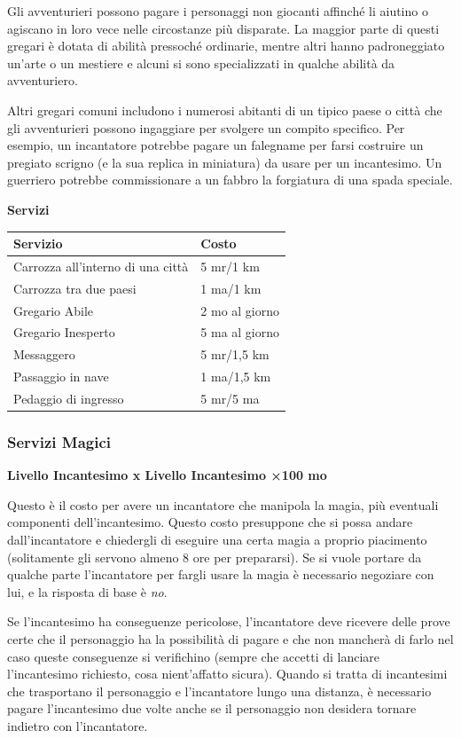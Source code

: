 \begin{multicols}{2}
\medskip

Gli avventurieri possono pagare i personaggi non giocanti affinché li aiutino o agiscano in loro vece nelle circostanze più disparate. La maggior parte di questi gregari è dotata di abilità pressoché ordinarie, mentre altri hanno padroneggiato un'arte o un mestiere e alcuni si sono specializzati in qualche abilità da avventuriero.

Altri gregari comuni includono i numerosi abitanti di un tipico paese o città che gli avventurieri possono ingaggiare per svolgere un compito specifico. Per esempio, un incantatore potrebbe pagare un falegname per farsi costruire un pregiato scrigno (e la sua replica in miniatura) da usare per un incantesimo.
Un guerriero potrebbe commissionare a un fabbro la forgiatura di una spada speciale.

\medskip

\textbf{Servizi}

\bigskip

\noindent\begin{tabularx}{\linewidth}{Xl}
	\toprule
\textbf{Servizio}&\textbf{Costo}\\
\toprule
Carrozza all'interno di una città&5 mr/1 km\\
Carrozza tra due paesi&1 ma/1 km\\
Gregario Abile&2 mo al giorno\\
Gregario Inesperto&5 ma al giorno\\
Messaggero&5 mr/1,5 km\\
Passaggio in nave&1 ma/1,5 km\\
Pedaggio di ingresso&5 mr/5 ma
\end{tabularx}

\subsubsection{Servizi Magici}

\textbf{Livello Incantesimo x Livello Incantesimo ×100 mo}

Questo è il costo per avere un incantatore che manipola la magia, più eventuali componenti dell'incantesimo. Questo costo presuppone che si possa andare dall'incantatore e chiedergli di eseguire una certa magia a proprio piacimento (solitamente gli servono almeno 8 ore per prepararsi). Se si vuole portare da qualche parte l'incantatore per fargli usare la magia è necessario negoziare con lui, e la risposta di base è \emph{no}.

Se l'incantesimo ha conseguenze pericolose, l'incantatore deve ricevere delle prove certe che il personaggio ha la possibilità di pagare e che non mancherà di farlo nel caso queste conseguenze si verifichino (sempre che accetti di lanciare l'incantesimo richiesto, cosa nient'affatto sicura). Quando si tratta di incantesimi che trasportano il personaggio e l'incantatore lungo una distanza, è necessario pagare l'incantesimo due volte anche se il personaggio non desidera tornare indietro con l'incantatore.


\end{multicols}
